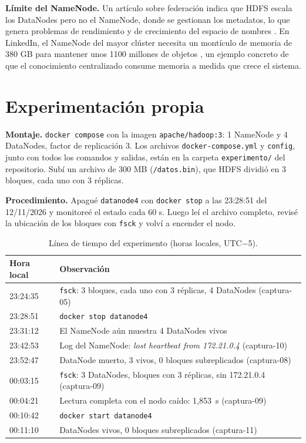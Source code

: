 \documentclass[11pt,a4paper]{article}
\begin{document}
\textbf{Límite del NameNode.} Un artículo sobre federación indica que HDFS escala los DataNodes pero no el NameNode, donde se gestionan los metadatos, lo que genera problemas de rendimiento y de crecimiento del espacio de nombres \cite{Dhulavvagol2023}. En LinkedIn, el NameNode del mayor clúster necesita un montículo de memoria de 380 GB para mantener unos 1100 millones de objetos \cite{LinkedIn2021}, un ejemplo concreto de que el conocimiento centralizado consume memoria a medida que crece el sistema.

\section{Experimentación propia}\label{sec:exp}
\textbf{Montaje.} \texttt{docker compose} con la imagen \texttt{apache/hadoop:3}: 1 NameNode y 4 DataNodes, factor de replicación 3. Los archivos \texttt{docker-compose.yml} y \texttt{config}, junto con todos los comandos y salidas, están en la carpeta \texttt{experimento/} del repositorio. Subí un archivo de 300 MB (\texttt{/datos.bin}), que HDFS dividió en 3 bloques, cada uno con 3 réplicas.

\textbf{Procedimiento.} Apagué \texttt{datanode4} con \texttt{docker stop} a las 23:28:51 del 12/11/2026 y monitoreé el estado cada 60 s. Luego leí el archivo completo, revisé la ubicación de los bloques con \texttt{fsck} y volví a encender el nodo.

\begin{table}[H]
\centering\small
\begin{tabularx}{\textwidth}{@{}l>{\raggedright\arraybackslash}X@{}}
\toprule
Hora local & Observación \\
\midrule
23:24:35 & \texttt{fsck}: 3 bloques, cada uno con 3 réplicas, 4 DataNodes (captura-05) \\
23:28:51 & \texttt{docker stop datanode4} \\
23:31:12 & El NameNode aún muestra 4 DataNodes vivos \\
23:42:53 & Log del NameNode: \emph{lost heartbeat from 172.21.0.4} (captura-10) \\
23:52:47 & 1 DataNode muerto, 3 vivos, 0 bloques subreplicados (captura-08) \\
00:03:15 & \texttt{fsck}: 3 DataNodes, bloques con 3 réplicas, sin 172.21.0.4 (captura-09) \\
00:04:21 & Lectura completa con el nodo caído: 1,853~s (captura-09) \\
00:10:42 & \texttt{docker start datanode4} \\
00:11:10 & 4 DataNodes vivos, 0 bloques subreplicados (captura-11) \\
\bottomrule
\end{tabularx}
\caption{Línea de tiempo del experimento (horas locales, UTC$-$5).}
\end{table}
\end{document}
